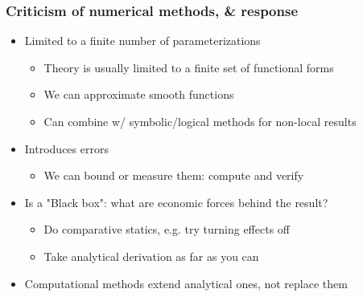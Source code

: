 \documentclass[bigger]{beamer}
\begin{document}
\begin{frame}%

\frametitle{Criticism of numerical methods, \& response}

\begin{itemize}
\item Limited to a finite number of parameterizations

\begin{itemize}
\item Theory is usually limited to a finite set of functional forms

\item We can approximate smooth functions

\item Can combine w/ symbolic/logical methods for non-local results  
\end{itemize}

\item Introduces errors

\begin{itemize}
\item We can bound or measure them: compute and verify
\end{itemize}

\item Is a "Black box": what are economic forces behind the result?

\begin{itemize}
\item Do comparative statics, e.g. try turning effects off

\item Take analytical derivation as far as you can
\end{itemize}

\item Computational methods extend analytical ones, not replace them
\end{itemize}

\end{frame}%
\end{document}
